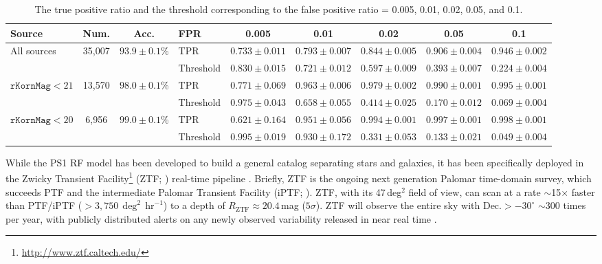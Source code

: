 \documentclass[twocolumn, dvipdfmx]{aastex62}
\begin{document}
\begin{table}[htb]
\begin{center}
\caption{The true positive ratio and the threshold 
corresponding to the false positive ratio = 0.005, 0.01, 0.02, 0.05, and 0.1. }
\label{tbl:fpr}
\begin{tabular}{lcc|lccccc}
\hline\hline
                 Source               & Num. & Acc. & FPR & 0.005 & 0.01 & 0.02 & 0.05 & 0.1 \\ \hline
\multirow{2}{*}{All sources} & \multirow{2}{*}{35,007} & \multirow{2}{*}{$93.9\pm0.1$\%} & 
                                              TPR  & $0.733 \pm 0.011$ &  $0.793 \pm 0.007$ & $0.844 \pm 0.005$ & $0.906 \pm 0.004$ & $0.946 \pm 0.002$  \\
\multicolumn{1}{l}{}                 & & & Threshold & $0.830 \pm 0.015$ &  $0.721 \pm 0.012$ & $0.597 \pm 0.009$ & $0.393 \pm 0.007$ & $0.224 \pm 0.004$  \\ \hline
\multirow{2}{*}{$\mathtt{rKornMag} < 21$} & \multirow{2}{*}{13,570} & \multirow{2}{*}{$98.0\pm0.1$\%} & 
                                              TPR  & $0.771 \pm 0.069$ &  $0.963 \pm 0.006$ & $0.979 \pm 0.002$ & $0.990 \pm 0.001$ & $0.995 \pm 0.001$ \\
                                                & & & Threshold & $0.975 \pm 0.043$ &  $0.658 \pm 0.055$ & $0.414 \pm 0.025$ & $0.170 \pm 0.012$ & $0.069 \pm 0.004$   \\ \hline
\multirow{2}{*}{$\mathtt{rKornMag} < 20$}  & \multirow{2}{*}{6,956}& \multirow{2}{*}{$99.0\pm0.1$\%} & 
                                              TPR  & $0.621 \pm 0.164$ &  $0.951 \pm 0.056$ & $0.994 \pm 0.001$ & $0.997 \pm 0.001$ & $0.998 \pm 0.001$  \\
                                                 & &  & Threshold & $0.995 \pm 0.019$ &  $0.930 \pm 0.172$ & $0.331 \pm 0.053$ & $0.133 \pm 0.021$ & $0.049 \pm 0.004$ \\ \hline
\end{tabular}
\end{center}
\end{table}

While the PS1 RF model has been developed to build a general catalog
separating stars and galaxies, it has been specifically deployed in the
Zwicky Transient Facility\footnote{\url{http://www.ztf.caltech.edu/}} (ZTF;
\citealt{Bellm:18:ZTF, Dekany:18:ZTF}) real-time pipeline
\citep{Masci:18:ZTF}. Briefly, ZTF is the ongoing next generation Palomar
time-domain survey, which succeeds PTF \citep{Rau09, Law09} and the
intermediate Palomar Transient Facility (iPTF; \citealt{Kulkarni13}). ZTF,
with its 47\,deg$^2$ field of view, can scan at a rate $\sim$15$\times$
faster than PTF/iPTF ($>3{,}750\,\deg^2\,\mathrm{hr}^{-1}$) to a depth of
$R_\mathrm{ZTF} \approx 20.4$\,mag ($5\sigma$). ZTF will observe the entire
sky with $\mathrm{Dec.} > -30^\circ$ $\sim$300 times per year, with publicly
distributed alerts on any newly observed variability released in near real
time \citep{Patterson:18:ZTF}.
\end{document}
